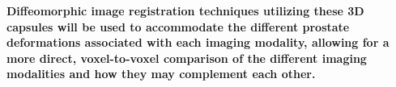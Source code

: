 \textbf{Diffeomorphic image registration techniques utilizing these 3D capsules
will be used to accommodate the different prostate deformations associated with
each imaging modality, allowing for a more direct, voxel-to-voxel comparison of
the different imaging modalities and how they may complement each other.}
